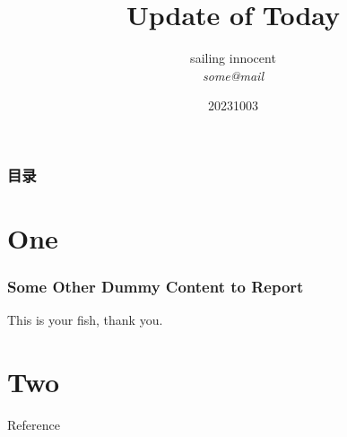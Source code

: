 \documentclass{simple/simple_pre}
\title[UPDATE]{ Update of Today}
\author[SI]{\texorpdfstring{sailing innocent \\ \smallskip \textit{some@mail}}{}}
\date[\today]{\texorpdfstring{20231003}{}}
\begin{document}
\begin{frame}
    \titlepage
\end{frame}
\begin{frame}
    \frametitle{目录}
    \tableofcontents
\end{frame}
\section{One}
\begin{frame}
    \frametitle{Some Other Dummy Content to Report}
    This is your fish, thank you.
\end{frame}
\section{Two}


\begin{frame}[allowframebreaks]{Reference}
    
    
\end{frame}
\end{document}
